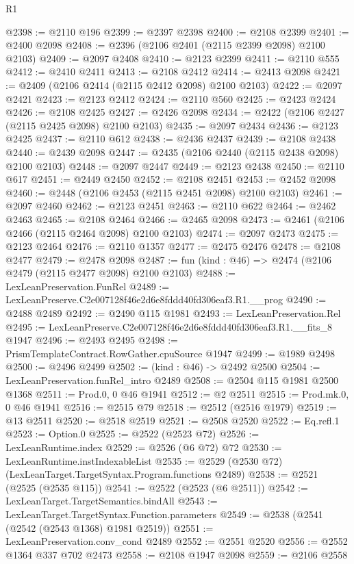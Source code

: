 \begin{lexlean}{R1}
\begin{coremodule}
@2398 := @2110 @196
@2399 := @2397 @2398
@2400 := @2108 @2399
@2401 := @2400 @2098
@2408 := @2396 (@2106 @2401 (@2115 @2399 @2098) @2100 @2103)
@2409 := @2097 @2408
@2410 := @2123 @2399
@2411 := @2110 @555
@2412 := @2410 @2411
@2413 := @2108 @2412
@2414 := @2413 @2098
@2421 := @2409 (@2106 @2414 (@2115 @2412 @2098) @2100 @2103)
@2422 := @2097 @2421
@2423 := @2123 @2412
@2424 := @2110 @560
@2425 := @2423 @2424
@2426 := @2108 @2425
@2427 := @2426 @2098
@2434 := @2422 (@2106 @2427 (@2115 @2425 @2098) @2100 @2103)
@2435 := @2097 @2434
@2436 := @2123 @2425
@2437 := @2110 @612
@2438 := @2436 @2437
@2439 := @2108 @2438
@2440 := @2439 @2098
@2447 := @2435 (@2106 @2440 (@2115 @2438 @2098) @2100 @2103)
@2448 := @2097 @2447
@2449 := @2123 @2438
@2450 := @2110 @617
@2451 := @2449 @2450
@2452 := @2108 @2451
@2453 := @2452 @2098
@2460 := @2448 (@2106 @2453 (@2115 @2451 @2098) @2100 @2103)
@2461 := @2097 @2460
@2462 := @2123 @2451
@2463 := @2110 @622
@2464 := @2462 @2463
@2465 := @2108 @2464
@2466 := @2465 @2098
@2473 := @2461 (@2106 @2466 (@2115 @2464 @2098) @2100 @2103)
@2474 := @2097 @2473
@2475 := @2123 @2464
@2476 := @2110 @1357
@2477 := @2475 @2476
@2478 := @2108 @2477
@2479 := @2478 @2098
@2487 := fun (kind : @46) => @2474 (@2106 @2479 (@2115 @2477 @2098) @2100 @2103)
@2488 := LexLeanPreservation.FunRel
@2489 := LexLeanPreserve.C2e007128f46e2d6e8fddd40fd306eaf3.R1.__prog
@2490 := @2488 @2489
@2492 := @2490 @115 @1981
@2493 := LexLeanPreservation.Rel
@2495 := LexLeanPreserve.C2e007128f46e2d6e8fddd40fd306eaf3.R1.__fits_8 @1947
@2496 := @2493 @2495
@2498 := PrismTemplateContract.RowGather.cpuSource @1947
@2499 := @1989 @2498
@2500 := @2496 @2499
@2502 := (kind : @46) -> @2492 @2500
@2504 := LexLeanPreservation.funRel_intro @2489
@2508 := @2504 @115 @1981 @2500 @1368
@2511 := Prod.{0, 0} @46 @1941
@2512 := @2 @2511
@2515 := Prod.mk.{0, 0} @46 @1941
@2516 := @2515 @79
@2518 := @2512 (@2516 @1979)
@2519 := @13 @2511
@2520 := @2518 @2519
@2521 := @2508 @2520
@2522 := Eq.refl.{1}
@2523 := Option.{0}
@2525 := @2522 (@2523 @72)
@2526 := LexLeanRuntime.index
@2529 := @2526 (@6 @72) @72
@2530 := LexLeanRuntime.instIndexableList
@2535 := @2529 (@2530 @72) (LexLeanTarget.TargetSyntax.Program.functions @2489)
@2538 := @2521 (@2525 (@2535 @115))
@2541 := @2522 (@2523 (@6 @2511))
@2542 := LexLeanTarget.TargetSemantics.bindAll
@2543 := LexLeanTarget.TargetSyntax.Function.parameters
@2549 := @2538 (@2541 (@2542 (@2543 @1368) @1981 @2519))
@2551 := LexLeanPreservation.conv_cond @2489
@2552 := @2551 @2520
@2556 := @2552 @1364 @337 @702 @2473
@2558 := @2108 @1947 @2098
@2559 := @2106 @2558

\end{coremodule}
\end{lexlean}
